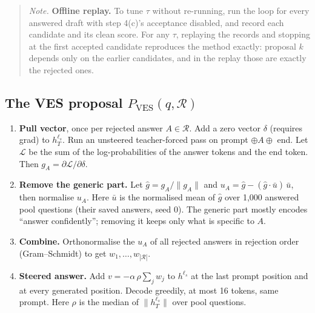 \documentclass[11pt]{article}
\newcommand{\note}[1]{%
  \begin{quote}\small\color{black!75}\textit{Note.} #1\end{quote}}
\begin{document}
\note{\textbf{Offline replay.} To tune $\tau$ without re-running, run the loop for every answered draft with
step 4(c)'s acceptance disabled, and record each candidate and its clean score. For any $\tau$, replaying the
records and stopping at the first accepted candidate reproduces the method exactly: proposal $k$ depends only
on the earlier candidates, and in the replay those are exactly the rejected ones.}

\subsection{The VES proposal \texorpdfstring{$P_{\mathrm{VES}}(q, \mathcal{R})$}{P\_VES(q, R)}}
\begin{enumerate}
  \item \textbf{Pull vector}, once per rejected answer $A \in \mathcal{R}$. Add a zero vector $\delta$
        (requires grad) to $h^{\ell_s}_T$. Run an unsteered teacher-forced pass on
        prompt $\oplus A \oplus$ end. Let $\mathcal{L}$ be the sum of the log-probabilities of the answer
        tokens and the end token. Then $g_A = \partial \mathcal{L} / \partial \delta$.
  \item \textbf{Remove the generic part.} Let $\hat g = g_A / \lVert g_A \rVert$ and
        $u_A = \hat g - (\hat g \cdot \bar u)\,\bar u$, then normalise $u_A$. Here $\bar u$ is the
        normalised mean of $\hat g$ over 1,000 answered pool questions (their saved answers, seed 0). The
        generic part mostly encodes ``answer confidently''; removing it keeps only what is specific to $A$.
  \item \textbf{Combine.} Orthonormalise the $u_A$ of all rejected answers in rejection order (Gram--Schmidt)
        to get $w_1, \dots, w_{|\mathcal{R}|}$.
  \item \textbf{Steered answer.} Add $v = -\alpha\,\rho \sum_j w_j$ to $h^{\ell_s}$ at the last prompt
        position and at every generated position. Decode greedily, at most 16 tokens, same prompt. Here
        $\rho$ is the median of $\lVert h^{\ell_s}_T \rVert$ over pool questions.
\end{enumerate}
\end{document}
